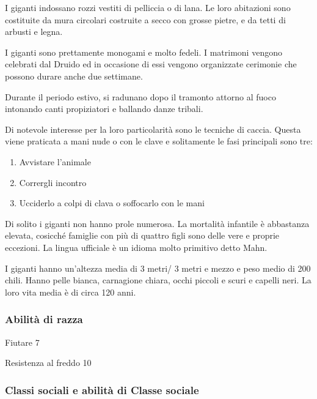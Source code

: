 \Moda I giganti indossano rozzi vestiti di pelliccia o di lana. Le
loro abitazioni sono costituite da mura circolari costruite a secco
con grosse pietre, e da tetti di arbusti e legna. 

I giganti sono prettamente monogami e molto fedeli. I matrimoni
vengono celebrati dal Druido ed in occasione di essi vengono
organizzate cerimonie che possono durare anche due settimane.

Durante il periodo estivo, si radunano dopo il tramonto attorno al
fuoco intonando canti propiziatori e ballando danze tribali.

Di notevole interesse per la loro particolarit\`a sono le tecniche di
caccia. Questa viene praticata a mani nude o con le clave e
solitamente le fasi principali sono tre:

\begin{enumerate}
\item Avvistare l'animale
\item Corrergli incontro
\item Ucciderlo a colpi di clava o soffocarlo con le mani
\end{enumerate}

Di solito i giganti non hanno prole numerosa. La mortalit\`a infantile
\`e abbastanza elevata, cosicch\'e famiglie con pi\`u di quattro figli
sono delle vere e proprie eccezioni. La lingua ufficiale \`e un idioma
molto primitivo detto Mahn.

\Fisico I giganti hanno un'altezza media di 3 metri/ 3 metri e mezzo e
peso medio di 200 chili. Hanno pelle bianca, carnagione chiara, occhi
piccoli e scuri e capelli neri. La loro vita media \`e di circa 120
anni.

\minmaxgiganti

\subsubsection{Abilit\`a di razza}
\begin{abilist}
\item Fiutare 7
\item Resistenza al freddo 10
\end{abilist}

\subsubsection{Classi sociali e abilit\`a di Classe sociale}


